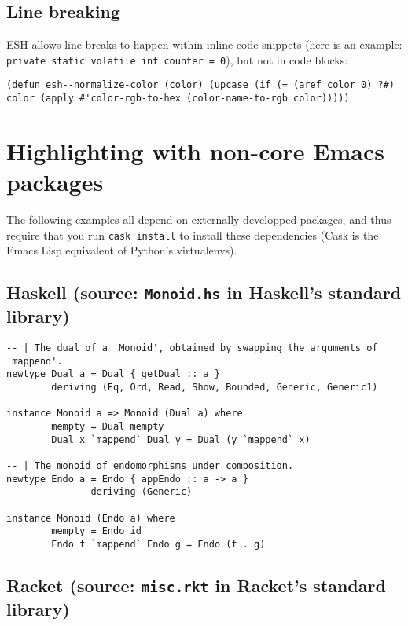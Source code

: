 \documentclass{article}
\def\javaverb{\verb}
\begin{document}
\subsection*{Line breaking}

ESH allows line breaks to happen within inline code snippets (here is an example: \javaverb|private static volatile int counter = 0|), but not in code blocks:

\begin{verbatim}
(defun esh--normalize-color (color) (upcase (if (= (aref color 0) ?#) color (apply #'color-rgb-to-hex (color-name-to-rgb color)))))
\end{verbatim}


\section*{Highlighting with non-core Emacs packages}

The following examples all depend on externally developped packages, and thus
require that you run \texttt{cask install} to install these dependencies (Cask
is the Emacs Lisp equivalent of Python's virtualenvs).

\subsection*{Haskell (source: \texttt{Monoid.hs} in Haskell's standard library)}

\begin{verbatim}
-- | The dual of a 'Monoid', obtained by swapping the arguments of 'mappend'.
newtype Dual a = Dual { getDual :: a }
        deriving (Eq, Ord, Read, Show, Bounded, Generic, Generic1)

instance Monoid a => Monoid (Dual a) where
        mempty = Dual mempty
        Dual x `mappend` Dual y = Dual (y `mappend` x)

-- | The monoid of endomorphisms under composition.
newtype Endo a = Endo { appEndo :: a -> a }
               deriving (Generic)

instance Monoid (Endo a) where
        mempty = Endo id
        Endo f `mappend` Endo g = Endo (f . g)
\end{verbatim}

\subsection*{Racket (source: \texttt{misc.rkt} in Racket's standard library)}
\end{document}
